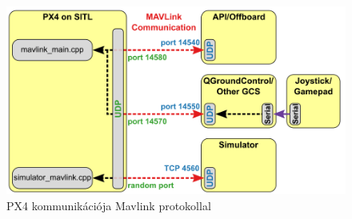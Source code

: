 \begin{figure}
	\centering
	\includegraphics[width=\linewidth]{figures/px4_sitl_overview.png}
	\caption{PX4 kommunikációja Mavlink protokollal \cite{px4dev}}
	\label{fig:px4com}
\end{figure}

